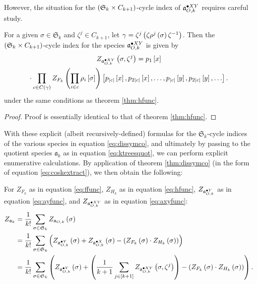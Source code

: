 \documentclass[sectionflow,singlespace,twoside]{brandiss} %
\numberwithin{section}{chapter}
\numberwithin{figure}{chapter}
\begin{document}
However, the situation for the $\pbrac{\mathfrak{S}_{k} \times C_{k+1}}$-cycle index of $\pointed[XY]{\mathfrak{a}}_{O, k}$ requires careful study.
\begin{theorem}
  \label{thm:axyfunc}
  For a given $\sigma \in \mathfrak{S}_{k}$ and $\zeta^{j} \in C_{k+1}$, let $\gamma = \zeta^{j} \pbrac{\zeta \rho^{j} \pbrac{\sigma} \zeta^{-1}}$.
  Then the $\pbrac{\mathfrak{S}_{k} \times C_{k+1}}$-cycle index for the species $\pointed[XY]{\mathfrak{a}}_{O, k}$ is given by
  \begin{multline}
    \label{eq:axyfunc}
    Z_{\pointed[XY]{\mathfrak{a}}_{O, k}} \pbrac{\sigma, \zeta^{j}} = p_{1} \sbrac{x} \\
    \cdot \prod_{c \in C \pbrac{\gamma}} Z_{F_{k}} \pbrac{\prod_{i \in c} \rho_{i} \sbrac{\sigma}} \sbrac{p_{\abs{c}} \sbrac{x}, p_{2 \abs{c}} \sbrac{x}, \dots, p_{\abs{c}} \sbrac{y}, p_{2 \abs{c}} \sbrac{y}, \dots}.
  \end{multline}
  under the same conditions as theorem \ref{thm:hfunc}.
\end{theorem}

\begin{proof}
  Proof is essentially identical to that of theorem \ref{thm:hfunc}.
\end{proof}

With these explicit (albeit recursively-defined) formulas for the $\mathfrak{S}_{k}$-cycle indices of the various species in equation \eqref{eq:dissymco}, and ultimately by passing to the quotient species $\mathfrak{a}_{k}$ as in equation \eqref{eq:ktreesquot}, we can perform explicit enumerative calculations.
By application of theorem \ref{thm:dissymco} (in the form of equation \eqref{eq:coskextract}), we then obtain the following:

\begin{theorem}
  \label{thm:ktreecyc}
  For $Z_{F_{k}}$ as in equation \eqref{eq:ffunc}, $Z_{H_{k}}$ as in equation \eqref{eq:hfunc}, $Z_{\pointed[Y]{\mathfrak{a}}_{O, k}}$ as in equation \eqref{eq:ayfunc}, and $Z_{\pointed[XY]{\mathfrak{a}}_{O, k}}$ as in equation \eqref{eq:axyfunc}:
  \begin{subequations}
    \begin{align}
      Z_{\mathfrak{a}_{k}} &= \frac{1}{k!} \sum_{\sigma \in \mathfrak{S}_{k}} Z_{\mathfrak{a}_{O, k}} \pbrac{\sigma} \\
      &= \frac{1}{k!} \sum_{\sigma \in \mathfrak{S}_{k}} \pbrac{Z_{\pointed[Y]{\mathfrak{a}}_{O, k}} \pbrac{\sigma} + Z_{\pointed[X]{\mathfrak{a}}_{O, k}} \pbrac{\sigma} - \pbrac{Z_{F_{k}} \pbrac{\sigma} \cdot Z_{H_{k}} \pbrac{\sigma}}} \\
      &= \frac{1}{k!} \sum_{\sigma \in \mathfrak{S}_{k}}
      \pbrac{Z_{\pointed[Y]{\mathfrak{a}}_{O, k}} \pbrac{\sigma} +
        \pbrac{\frac{1}{k+1} \sum_{j \in \sbrac{k+1}}
          Z_{\pointed[XY]{\mathfrak{a}}_{O, k}} \pbrac{\sigma,
            \zeta^{j}}} - \pbrac{Z_{F_{k}} \pbrac{\sigma} \cdot
          Z_{H_{k}} \pbrac{\sigma}}}.
    \end{align}
  \end{subequations}

\end{theorem}
\end{document}
